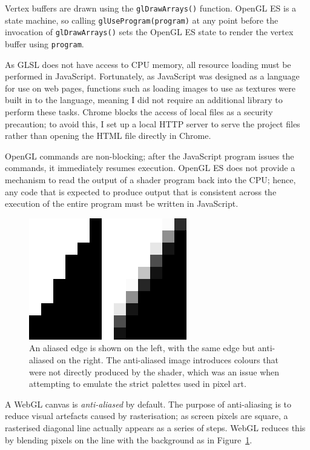 \documentclass[12pt,twoside,notitlepage]{report}
\begin{document}
Vertex buffers are drawn using the \verb|glDrawArrays()| function. OpenGL ES is a state machine, so calling \verb|glUseProgram(program)| at any point before the invocation of \verb|glDrawArrays()| sets the OpenGL ES state to render the vertex buffer using \verb|program|.

As GLSL does not have access to CPU memory, all resource loading must be performed in JavaScript. Fortunately, as JavaScript was designed as a language for use on web pages, functions such as loading images to use as textures were built in to the language, meaning I did not require an additional library to perform these tasks. Chrome blocks the access of local files as a security precaution; to avoid this, I set up a local HTTP server to serve the project files rather than opening the HTML file directly in Chrome.

OpenGL commands are non-blocking; after the JavaScript program issues the commands, it immediately resumes execution. OpenGL ES does not provide a mechanism to read the output of a shader program back into the CPU; hence, any code that is expected to produce output that is consistent across the execution of the entire program must be written in JavaScript.

\begin{figure}[h!]
\centering
\includegraphics{aliasing}
\caption{An aliased edge is shown on the left, with the same edge but anti-aliased on the right. The anti-aliased image introduces colours that were not directly produced by the shader, which was an issue when attempting to emulate the strict palettes used in pixel art.}
\label{fig:aliasing}
\end{figure}

A WebGL canvas is \textit{anti-aliased} by default. The purpose of anti-aliasing is to reduce visual artefacts caused by rasterisation; as screen pixels are square, a rasterised diagonal line actually appears as a series of steps. WebGL reduces this by blending pixels on the line with the background as in Figure~\ref{fig:aliasing}.
\end{document}
